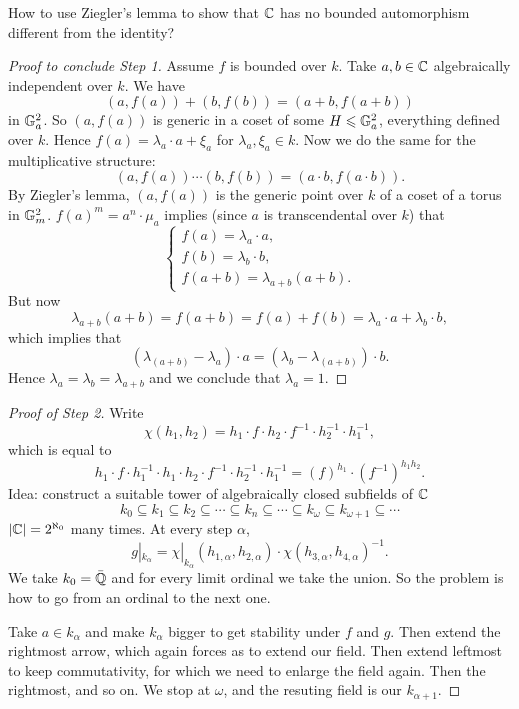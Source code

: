 \documentclass[A4paper, british, reqno]{amsart}
\theoremstyle{darkgreentheorem}
\theoremstyle{darkbluedefinition}
\theoremstyle{darkredexample}
\theoremstyle{remark}
\newcommand{\1}{\mathbbm{1}}
\newcommand{\sub}{\subseteq}
\begin{document}
How to use Ziegler's lemma to show that $\mathbb{C}$ has no bounded automorphism different from the identity?
\begin{proof}[Proof to conclude Step 1]
    Assume $f$ is bounded over $k$.
    Take $a,b\in \mathbb{C}$ algebraically independent over $k$.
    We have
    \[ (a,f(a))+(b,f(b))=(a+b,f(a+b)) \]
    in $\mathbb{G}_{a}^{2}$.
    So $(a,f(a))$ is generic in a coset of some $H\leqslant \mathbb{G}_{a}^{2}$, everything defined over $k$.
    Hence $f(a)=\lambda_{a}\cdot a +\xi_{a}$ for $\lambda_{a},\xi_{a}\in k$.
    Now we do the same for the multiplicative structure:
    \[ (a,f(a))\cdots (b,f(b))=(a\cdot b,f(a\cdot b)). \]
    By Ziegler's lemma, $(a,f(a))$ is the generic point over $k$ of a coset of a torus in $\mathbb{G}_{m}^{2}$.
    $f(a)^{m}=a^{n}\cdot \mu_{a}$ implies (since $a$ is transcendental over $k$) that
    \[\begin{cases}
	f(a)=\lambda_{a}\cdot a, \\
	f(b)=\lambda_{b}\cdot b, \\
	f(a+b)=\lambda_{a+b}(a+b).
    \end{cases}\]
    But now
    \[ \lambda_{a+b}(a+b)=f(a+b)=f(a)+f(b)=\lambda_{a} \cdot a +\lambda_{b} \cdot b ,\]
    which implies that
    \[ (\lambda_{(a+b)}-\lambda_{a})\cdot a = (\lambda_{b}-\lambda_{(a+b)})\cdot b.\]
    Hence $\lambda_{a}=\lambda_{b}=\lambda_{a+b}$ and we conclude that $\lambda_{a}=1$.
\end{proof}

\begin{proof}[Proof of Step 2]
    Write
    \[ \chi(h_{1},h_{2})=h_{1}\cdot f\cdot h_{2}\cdot f^{-1}\cdot h_{2}^{-1}\cdot h_{1}^{-1}, \]
    which is equal to
    \[ h_{1}\cdot f\cdot h_{1}^{-1}\cdot h_{1}\cdot h_{2} \cdot f^{-1} \cdot h_{2}^{-1} \cdot h_{1}^{-1} =(f)^{h_{1}}\cdot (f^{-1})^{h_{1}h_{2}}. \]
    Idea: construct a suitable tower of algebraically closed subfields of $\mathbb{C}$
    \[ k_{0}\sub k_{1}\sub k_{2}\sub \cdots \sub k_{n}\sub \cdots \sub k_{\omega}\sub k_{\omega+1}\sub \cdots \]
    $|\mathbb{C}|=2^{\aleph_{0}}$ many times.
    At every step $\alpha$,
    \[ g|_{k_{\alpha}}=\chi|_{k_{\alpha}}(h_{1,\alpha},h_{2,\alpha})\cdot \chi(h_{3,\alpha},h_{4,\alpha})^{-1}. \]
    We take $k_{0}=\bar{\mathbb{Q}}$ and for every limit ordinal we take the union.
    So the problem is how to go from an ordinal to the next one.
    \begin{center}
    \end{center}
    Take $a\in k_{\alpha}$ and make $k_{\alpha}$ bigger to get stability under $f$ and $g$.
    Then extend the rightmost arrow, which again forces as to extend our field.
    Then extend leftmost to keep commutativity, for which we need to enlarge the field again.
    Then the rightmost, and so on.
    We stop at $\omega$, and the resuting field is our $k_{\alpha+1}$.
\end{proof}



\end{document}
